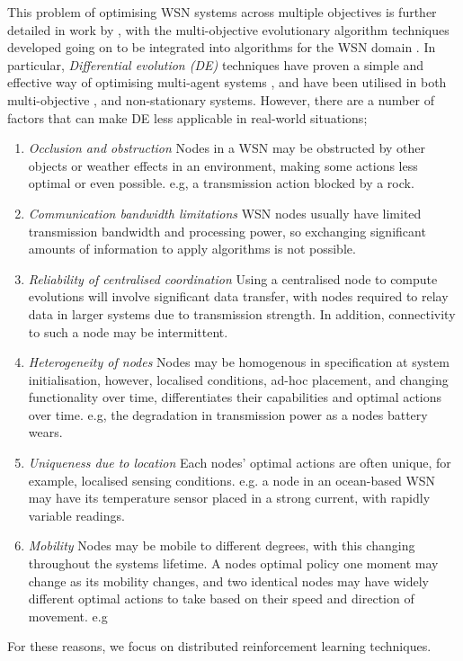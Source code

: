 This problem of optimising WSN systems across multiple objectives is further detailed in work by \cite{ s150717572}, with the multi-objective evolutionary algorithm techniques developed going on to be integrated into algorithms for the WSN domain \citep{4633340,SENGUPTA2013405}. In particular, \textit{Differential evolution (DE)} \cite{XXX} techniques have proven a simple and effective way of optimising multi-agent systems \cite{XXX}, and have been utilised in both multi-objective \cite{XXX}, and non-stationary \cite{XXX} systems. However, there are a number of factors that can make DE less applicable in real-world situations;
\begin{enumerate}
	\item \textit{Occlusion and obstruction} Nodes in a WSN may be obstructed by other objects or weather effects in an environment, making some actions less optimal or even possible. e.g, a transmission action blocked by a rock.

	\item \textit{Communication bandwidth limitations} WSN nodes usually have limited transmission bandwidth and processing power, so exchanging significant amounts of information to apply algorithms is not possible. 
	
	\item \textit{Reliability of centralised coordination} Using a centralised node to compute evolutions will involve significant data transfer, with nodes required to relay data in larger systems due to transmission strength. In addition, connectivity to such a node may be intermittent. 
	
	\item \textit{Heterogeneity of nodes} Nodes may be homogenous in specification at system initialisation, however, localised conditions, ad-hoc placement, and changing functionality over time, differentiates their capabilities and optimal actions over time. e.g, the degradation in transmission power as a nodes battery wears.
	
	\item \textit{Uniqueness due to location} Each nodes' optimal actions are often unique, for example, localised sensing conditions. e.g. a node in an ocean-based WSN may have its temperature sensor placed in a strong current, with rapidly variable readings.
	
	\item \textit{Mobility} Nodes may be mobile to different degrees, with this changing throughout the systems lifetime. A nodes optimal policy one moment may change as its mobility changes, and two identical nodes may have widely different optimal actions to take based on their speed and direction of movement. e.g   
\end{enumerate}
For these reasons, we focus on distributed reinforcement learning techniques.

